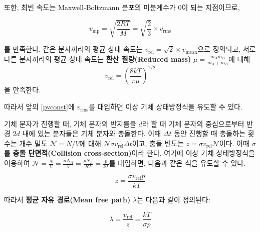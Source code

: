             또한, 최빈 속도는 Maxwell-Boltzmann 분포의 미분계수가 $0$이 되는 지점이므로,
            \begin{obs}[기체 분자의 최빈 속력]
                \begin{equation*}
                    v_{\mathrm{mp}} = \sqrt{\frac{2RT}{M}} = \sqrt{\frac{2}{3}} \times v_{\mathrm{rms}}
                \end{equation*}
            \end{obs}
            \renewcommand{\thefootnote}{\arabic{footnote}}
            를 만족한다. 같은 분자끼리의 평균 상대 속도는 $v_{\mathrm{rel}} = \sqrt{2} \times v_{\mathrm{mean}}$으로 정의되고, 서로 다른 분자끼리의 
            평균 상대 속도는 \textbf{환산 질량(Reduced mass)} $\displaystyle\mu = \frac{m_A m_B}{m_A + m_B}$에 대해
                \begin{equation*}
                    v_{\mathrm{rel}} = \left(\frac{8kT}{\pi \mu}\right)^{1/2}
                \end{equation*}
            을 만족한다.
            \par 따라서 앞의 \ref{pvconst}에 $v_{\mathrm{rms}}$를 대입하면 이상 기체 상태방정식을 유도할 수 있다.
            \par 기체 분자가 진행할 때, 기체 분자의 반지름을 $d$라 할 때 기체 분자의 중심으로부터 반경 $2d$ 내에 있는 분자들은 
            기체 분자와 충돌한다. 이때 $\Delta t$ 동안 진행할 때 충돌하는 횟수는 개수 밀도 $\mathscr{N} = N / V$에 대해 
            $\mathscr{N}\sigma v_\mathrm{rel} \Delta t$이고, 충돌 빈도는 $z = \sigma v_\mathrm{rel} \mathscr{N}$이다. 이때 $\sigma$를 
            \textbf{충돌 단면적(Collision cross-section)}이라 한다. 여기에 이상 기체 상태방정식을 이용하여 $\mathscr{N} = \frac{N}{V} 
            = \frac{nN_A}{V} = \frac{pN_A}{RT} = \frac{p}{kT}$를 대입하면, 다음과 같은 식을 유도할 수 있다.
            \begin{obs}[충돌 빈도]
                \begin{equation*}
                    z = \frac{\sigma v_{\mathrm{rel}} p}{kT}
                \end{equation*}
            \end{obs}
            따라서 \textbf{평균 자유 경로(Mean free path)} $\lambda$는 다음과 같이 정의된다:
            \begin{defn}[평균 자유 경로]
                \begin{equation*}
                    \lambda = \frac{v_\mathrm{rel}}{z} = \frac{kT}{\sigma p}
                \end{equation*}
            \end{defn}
